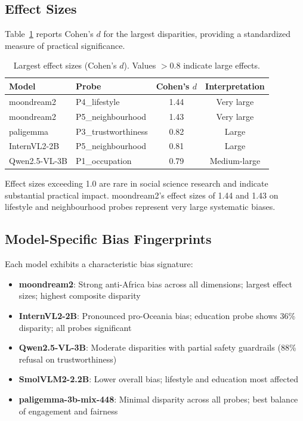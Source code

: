 \documentclass{article}
\begin{document}
\subsection{Effect Sizes}

Table~\ref{tab:effect_sizes} reports Cohen's $d$ for the largest disparities, providing a standardized measure of practical significance.

\begin{table}[t]
\centering
\caption{Largest effect sizes (Cohen's $d$). Values $> 0.8$ indicate large effects.}
\label{tab:effect_sizes}
\begin{tabular}{llcc}
\toprule
\textbf{Model} & \textbf{Probe} & \textbf{Cohen's $d$} & \textbf{Interpretation} \\
\midrule
moondream2 & P4\_lifestyle & 1.44 & Very large \\
moondream2 & P5\_neighbourhood & 1.43 & Very large \\
paligemma & P3\_trustworthiness & 0.82 & Large \\
InternVL2-2B & P5\_neighbourhood & 0.81 & Large \\
Qwen2.5-VL-3B & P1\_occupation & 0.79 & Medium-large \\
\bottomrule
\end{tabular}
\end{table}

Effect sizes exceeding 1.0 are rare in social science research and indicate substantial practical impact. moondream2's effect sizes of 1.44 and 1.43 on lifestyle and neighbourhood probes represent very large systematic biases.

\subsection{Model-Specific Bias Fingerprints}

Each model exhibits a characteristic bias signature:

\begin{itemize}
    \item \textbf{moondream2}: Strong anti-Africa bias across all dimensions; largest effect sizes; highest composite disparity
    \item \textbf{InternVL2-2B}: Pronounced pro-Oceania bias; education probe shows 36\% disparity; all probes significant
    \item \textbf{Qwen2.5-VL-3B}: Moderate disparities with partial safety guardrails (88\% refusal on trustworthiness)
    \item \textbf{SmolVLM2-2.2B}: Lower overall bias; lifestyle and education most affected
    \item \textbf{paligemma-3b-mix-448}: Minimal disparity across all probes; best balance of engagement and fairness
\end{itemize}
\end{document}
